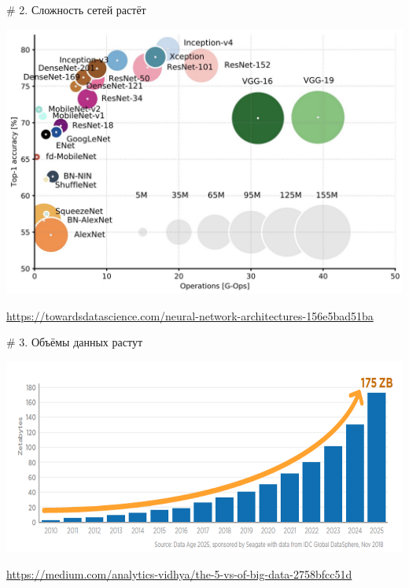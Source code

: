\documentclass[notes,12pt, aspectratio=169]{beamer}
\newenvironment{wideitemize}{\itemize\addtolength{\itemsep}{10pt}}{\enditemize}
\begin{document}
\begin{frame}{\# 2. Сложность сетей растёт}
\begin{center}
	\includegraphics[width=.67\linewidth]{trend22.png}
\end{center}
\vfill %
\footnotesize
\color{blue} \url{https://towardsdatascience.com/neural-network-architectures-156e5bad51ba}
\end{frame} 


\begin{frame}{\# 3. Объёмы данных растут}
\begin{center}
	\includegraphics[width=.8\linewidth]{data-vol-gr.png}
\end{center}
\vfill %
\footnotesize
\color{blue} \url{https://medium.com/analytics-vidhya/the-5-vs-of-big-data-2758bfcc51d}
\end{frame} 
\end{document}
